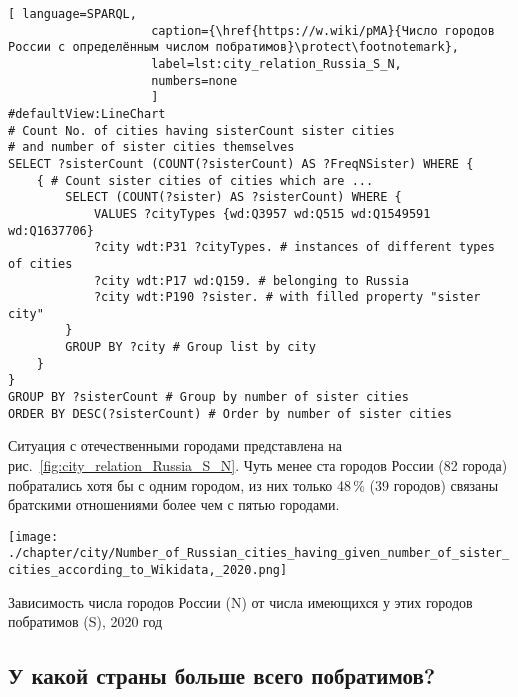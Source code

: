 \begin{lstlisting}[ language=SPARQL, 
                    caption={\href{https://w.wiki/pMA}{Число городов России с определённым числом побратимов}\protect\footnotemark},
                    label=lst:city_relation_Russia_S_N,
                    numbers=none
                    ]
#defaultView:LineChart                                                   
# Count No. of cities having sisterCount sister cities  
# and number of sister cities themselves
SELECT ?sisterCount (COUNT(?sisterCount) AS ?FreqNSister) WHERE {                                                                                  
	{ # Count sister cities of cities which are ...
		SELECT (COUNT(?sister) AS ?sisterCount) WHERE {    
			VALUES ?cityTypes {wd:Q3957 wd:Q515 wd:Q1549591 wd:Q1637706}
			?city wdt:P31 ?cityTypes. # instances of different types of cities
			?city wdt:P17 wd:Q159. # belonging to Russia
			?city wdt:P190 ?sister. # with filled property "sister city"
		}
		GROUP BY ?city # Group list by city                             
	}
}
GROUP BY ?sisterCount # Group by number of sister cities
ORDER BY DESC(?sisterCount) # Order by number of sister cities                                  
\end{lstlisting}

Ситуация с отечественными городами представлена на рис.~\ref{fig:city_relation_Russia_S_N}. 
Чуть менее ста городов России (82 города) побратались хотя бы с одним городом, 
из них только 48\,\% (39 городов) связаны братскими отношениями более чем с пятью городами.


\begin{marginfigure}[18pt]
    \texttt{[image: ./chapter/city/Number\_of\_Russian\_cities\_having\_given\_number\_of\_sister\_cities\_according\_to\_Wikidata,\_2020.png]}
  \caption[Зависимость числа городов России от числа побратимов, 2020 год.]{Зависимость числа городов России (N) от числа имеющихся у этих городов побратимов (S), 2020 год}
  \label{fig:city_relation_Russia_S_N}
\end{marginfigure}




\newpage
\subsection{У какой страны больше всего побратимов?}

